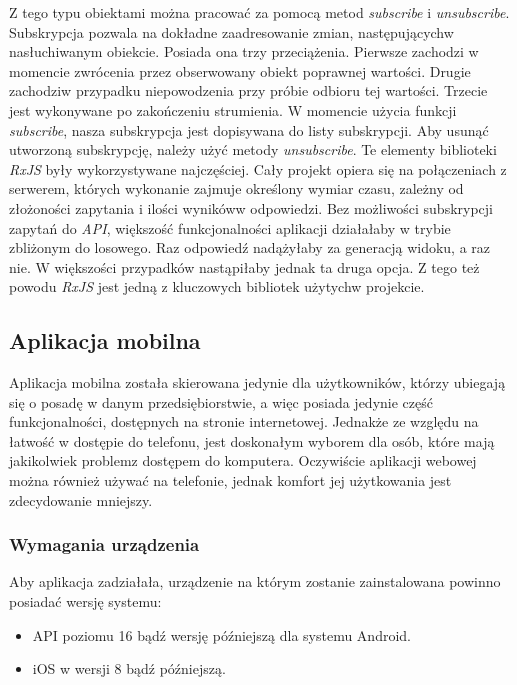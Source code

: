\documentclass[twoside]{projektInzynierskiMS}
\numberwithin{figure}{section}
\begin{document}
Z tego typu obiektami można pracować za pomocą metod \textit{subscribe} i \textit{unsubscribe}. Subskrypcja pozwala na dokładne zaadresowanie zmian, następujących\linebreak w nasłuchiwanym obiekcie. Posiada ona trzy przeciążenia. Pierwsze zachodzi w momencie zwrócenia przez obserwowany obiekt poprawnej wartości. Drugie zachodzi\linebreak w przypadku niepowodzenia przy próbie odbioru tej wartości. Trzecie jest wykonywane po zakończeniu strumienia.
W momencie użycia funkcji \textit{subscribe}, nasza subskrypcja jest dopisywana do listy subskrypcji. Aby usunąć utworzoną subskrypcję, należy użyć metody \textit{unsubscribe}.
Te elementy biblioteki \textit{RxJS} były wykorzystywane najczęściej. Cały projekt opiera się na połączeniach z serwerem, których wykonanie zajmuje określony wymiar czasu, zależny od złożoności zapytania i ilości wyników\linebreak w odpowiedzi. Bez możliwości subskrypcji zapytań do \textit{API}, większość funkcjonalności aplikacji działałaby w trybie zbliżonym do losowego. Raz odpowiedź nadążyłaby za generacją widoku, a raz nie. W większości przypadków nastąpiłaby jednak ta druga opcja. Z tego też powodu \textit{RxJS} jest jedną z kluczowych bibliotek użytych\linebreak w projekcie.

\subsection{Aplikacja mobilna}
Aplikacja mobilna została skierowana jedynie dla użytkowników, którzy ubiegają się o posadę w danym przedsiębiorstwie, a więc posiada jedynie część funkcjonalności, dostępnych na stronie internetowej. Jednakże ze względu na łatwość w dostępie do telefonu, jest doskonałym wyborem dla osób, które mają jakikolwiek problem\linebreak z dostępem do komputera. Oczywiście aplikacji webowej można również używać na telefonie, jednak komfort jej użytkowania jest zdecydowanie mniejszy.
\subsubsection{Wymagania urządzenia}

Aby aplikacja zadziałała, urządzenie na którym zostanie zainstalowana powinno posiadać wersję systemu: 
\begin{itemize}
    \item API poziomu 16 bądź wersję późniejszą dla systemu Android.
    \item iOS w wersji 8 bądź późniejszą.
\end{itemize}
\end{document}
